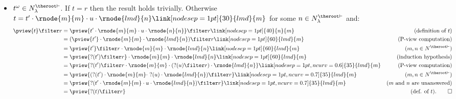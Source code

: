 \begin{itemize}
\item $t^\omega \in N^{\theroot\vdash}_\lambda$. If $t=r$ then the result holds trivially.
Otherwise $t =  t' \cdot \rnode{m}{m} \cdot u \cdot
\rnode{lmd}{n} \link[nodesep=1pt]{30}{lmd}{m}$ for some $n\in
    N^{\theroot \vdash}_\lambda$ and:
        \begin{align*}
        \pview{t} \filter  r
        &= \pview{t' \cdot \rnode{m}{m} \cdot u \cdot \rnode{n}{n}} \filter  r
               \link[nodesep=1pt]{40}{n}{m}                   & (\mbox{definition of } t)\\
        &= (\pview{t'} \cdot \rnode{m}{m} \cdot  \rnode{lmd}{n} ) \filter  r
               \link[nodesep=1pt]{60}{lmd}{m}                 & (\mbox{P-view computation}) \\
        &= \pview{t'} \filter  r \cdot \rnode{m}{m} \cdot  \rnode{lmd}{n}
               \link[nodesep=1pt]{60}{lmd}{m}                 & (m, n \in N^{\theroot \vdash}) \\
        &= \pview{?(t')\filter r}  \cdot \rnode{m}{m} \cdot  \rnode{lmd}{n}
               \link[nodesep=1pt]{60}{lmd}{m}                 & \mbox{(induction hypothesis)} \\
        &= \pview{ ?(t') \filter r \cdot \rnode{m}{m} \cdot (?(u) \filter r) \cdot \rnode{lmd}{n}}
\link[nodesep=1pt,ncurv=0.6]{35}{lmd}{m}                                                          & (\mbox{P-view computation}) \\
        &= \pview{ (?(t') \cdot \rnode{m}{m} \cdot\ ?(u) \cdot \rnode{lmd}{n}) \filter r }
\link[nodesep=1pt,ncurv=0.7]{35}{lmd}{m}                                                          & (m, n \in N^{\theroot \vdash}) \\
        &= \pview{ ?(t' \cdot \rnode{m}{m} \cdot u \cdot \rnode{lmd}{n}) \filter r }
\link[nodesep=1pt,ncurv=0.7]{35}{lmd}{m}                                                          & \mbox{($m$ and $n$ are unanswered)} \\
        &= \pview{ ?(t) \filter r }                & \mbox{(def. of $t$).} \qed
        \end{align*}
\end{itemize}
